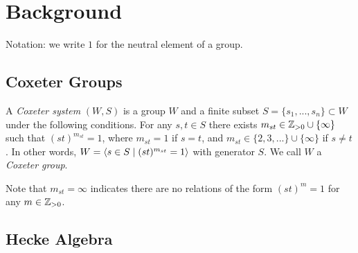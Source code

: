 \chapter{Background}


Notation: we write $1$ for the neutral element of a group.

\section{Coxeter Groups}

\begin{definition}
    A \textit{Coxeter system} $(W,S)$ is a group $W$ and a finite subset $S = \{s_1, ..., s_n\} \subset W$ under the following conditions. For any $s,t \in S$ there exists $m_{st} \in \mathbb{Z}_{>0}\cup\{\infty\}$ such that $(st)^{m_{st}} = 1$, where $m_{st} = 1$ if $s = t$, and $m_{st} \in \{2,3,...\} \cup \{\infty\}$ if $s \neq t$. In other words, $W = {\left\langle s \in S \mathrel{|} (st)^{m_{st}} = 1 \right\rangle}$ with generator $S$. We call $W$ a \textit{Coxeter group}.
\end{definition}

Note that $m_{st} = \infty$ indicates there are no relations of the form $(st)^{m} = 1$ for any $m \in \mathbb{Z}_{>0}$. \n



\section{Hecke Algebra}